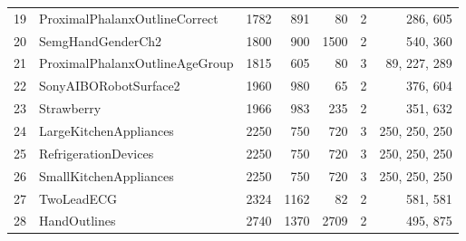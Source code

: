 \documentclass[11pt]{article}
\theoremstyle{plain}
\begin{document}
\begin{small}
\begin{longtable}[c]{clrrrcr}
19 & ProximalPhalanxOutlineCorrect & 1782 & 891 & 80 & 2 & 286,  605 \\ 
20 & SemgHandGenderCh2 & 1800 & 900 & 1500 & 2 & 540,  360 \\ 
21 & ProximalPhalanxOutlineAgeGroup & 1815 & 605 & 80 & 3 & 89,  227,  289 \\ 
22 & SonyAIBORobotSurface2 & 1960 & 980 & 65 & 2 & 376,  604 \\ 
23 & Strawberry & 1966 & 983 & 235 & 2 & 351,  632 \\ 
24 & LargeKitchenAppliances & 2250 & 750 & 720 & 3 & 250,  250,  250 \\ 
25 & RefrigerationDevices & 2250 & 750 & 720 & 3 & 250,  250,  250 \\ 
26 & SmallKitchenAppliances & 2250 & 750 & 720 & 3 & 250,  250,  250 \\ 
27 & TwoLeadECG & 2324 & 1162 & 82 & 2 & 581,  581 \\ 
28 & HandOutlines & 2740 & 1370 & 2709 & 2 & 495,  875 \\ 

\end{longtable}
\end{small}
\end{document}
